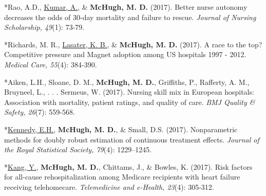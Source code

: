 \documentclass[10pt,]{article}
\begin{document}
{{{{{{{{{{{{{{{\vspace{4mm}

\begin{hangparas}{.25in}{1}

*Rao, A.D., {\underline {Kumar, A.}}, \& {\textbf {McHugh, M. D.}} (2017). Better nurse autonomy decreases the odds of 30-day mortality and failure to rescue. {\textit {Journal of Nursing Scholarship, 49}}(1): 73-79.

\end{hangparas}

\vspace{4mm}

\begin{hangparas}{.25in}{1}

*Richards, M. R., {\underline {Lasater, K. B.}}, \& {\textbf {McHugh, M. D.}} (2017). A race to the top? Competitive pressure and Magnet adoption among US hospitals 1997 - 2012. {\textit {Medical Care, 55}}(4): 384-390.

\end{hangparas}

\vspace{4mm}

\begin{hangparas}{.25in}{1}

*Aiken, L.H., Sloane, D. M., {\textbf {McHugh, M. D.}}, Griffiths, P., Rafferty, A. M., Bruyneel, L., . . . Sermeus, W. (2017). Nursing skill mix in European hospitals: Association with mortality, patient ratings, and quality of care. {\textit {BMJ Quality \& Safety, 26}}(7): 559-568.

\end{hangparas}

\vspace{4mm}

\begin{hangparas}{.25in}{1}

*{\underline {Kennedy, E.H.}}, {\textbf {McHugh, M. D.}}, \& Small, D.S. (2017). Nonparametric methods for doubly robust estimation of continuous treatment effects. {\textit {Journal of the Royal Statistical Society, 79}}(4): 1229–1245.

\end{hangparas}

\vspace{4mm}

\begin{hangparas}{.25in}{1}

*{\underline {Kang, Y.}}, {\textbf {McHugh, M. D.}}, Chittams, J., \& Bowles, K. (2017). Risk factors for all-cause rehospitalization among Medicare recipients with heart failure receiving telehomecare. {\textit {Telemedicine and e-Health, 23}}(4): 305-312.


\end{hangparas}}}}}}}}}}}}}}}}
\end{document}
